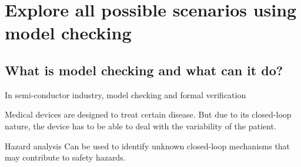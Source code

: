 
%

\section{Explore all possible scenarios using model checking}
\subsection{What is model checking and what can it do?}
In semi-conductor industry, model checking and formal verification

Medical devices are designed to treat certain disease. But due to its closed-loop nature, the device has to be able to deal with the variability of the patient.

Hazard analysis
Can be used to identify unknown closed-loop mechanisms that may contribute to safety hazards.

